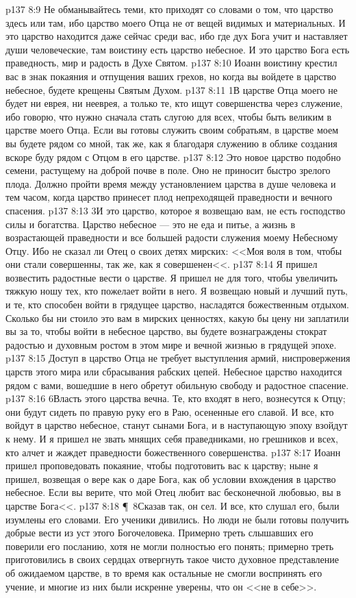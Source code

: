 \vs p137 8:9 Не обманывайтесь теми, кто приходят со словами о том, что царство здесь или там, ибо царство моего Отца не от вещей видимых и материальных. И это царство находится даже сейчас среди вас, ибо где дух Бога учит и наставляет души человеческие, там воистину есть царство небесное. И это царство Бога есть праведность, мир и радость в Духе Святом.
\vs p137 8:10 Иоанн воистину крестил вас в знак покаяния и отпущения ваших грехов, но когда вы войдете в царство небесное, будете крещены Святым Духом.
\vs p137 8:11 1В царстве Отца моего не будет ни еврея, ни нееврея, а только те, кто ищут совершенства через служение, ибо говорю, что нужно сначала стать слугою для всех, чтобы быть великим в царстве моего Отца. Если вы готовы служить своим собратьям, в царстве моем вы будете рядом со мной, так же, как я благодаря служению в облике создания вскоре буду рядом с Отцом в его царстве.
\vs p137 8:12 Это новое царство подобно семени, растущему на доброй почве в поле. Оно не приносит быстро зрелого плода. Должно пройти время между установлением царства в душе человека и тем часом, когда царство принесет плод непреходящей праведности и вечного спасения.
\vs p137 8:13 3И это царство, которое я возвещаю вам, не есть господство силы и богатства. Царство небесное --- это не еда и питье, а жизнь в возрастающей праведности и все большей радости служения моему Небесному Отцу. Ибо не сказал ли Отец о своих детях мирских: <<Моя воля в том, чтобы они стали совершенны, так же, как я совершенен<<.
\vs p137 8:14 Я пришел возвестить радостные вести о царстве. Я пришел не для того, чтобы увеличить тяжкую ношу тех, кто пожелает войти в него. Я возвещаю новый и лучший путь, и те, кто способен войти в грядущее царство, насладятся божественным отдыхом. Сколько бы ни стоило это вам в мирских ценностях, какую бы цену ни заплатили вы за то, чтобы войти в небесное царство, вы будете вознаграждены стократ радостью и духовным ростом в этом мире и вечной жизнью в грядущей эпохе.
\vs p137 8:15 Доступ в царство Отца не требует выступления армий, ниспровержения царств этого мира или сбрасывания рабских цепей. Небесное царство находится рядом с вами, вошедшие в него обретут обильную свободу и радостное спасение.
\vs p137 8:16 6Власть этого царства вечна. Те, кто входят в него, вознесутся к Отцу; они будут сидеть по правую руку его в Раю, осененные его славой. И все, кто войдут в царство небесное, станут сынами Бога, и в наступающую эпоху взойдут к нему. И я пришел не звать мнящих себя праведниками, но грешников и всех, кто алчет и жаждет праведности божественного совершенства.
\vs p137 8:17 Иоанн пришел проповедовать покаяние, чтобы подготовить вас к царству; ныне я пришел, возвещая о вере как о даре Бога, как об условии вхождения в царство небесное. Если вы верите, что мой Отец любит вас бесконечной любовью, вы в царстве Бога<<.
\vs p137 8:18 \P\ 8Сказав так, он сел. И все, кто слушал его, были изумлены его словами. Его ученики дивились. Но люди не были готовы получить добрые вести из уст этого Богочеловека. Примерно треть слышавших его поверили его посланию, хотя не могли полностью его понять; примерно треть приготовились в своих сердцах отвергнуть такое чисто духовное представление об ожидаемом царстве, в то время как остальные не смогли воспринять его учение, и многие из них были искренне уверены, что он <<не в себе>>.
